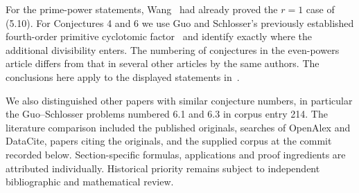 \documentclass[11pt,a4paper]{article}
\numberwithin{equation}{section}
\begin{document}
For the prime-power statements, Wang~\cite{Wang} had already proved the $r=1$ case of (5.10). For Conjectures 4 and 6 we use Guo and Schlosser's previously established fourth-order primitive cyclotomic factor~\cite{GS4} and identify exactly where the additional divisibility enters. The numbering of conjectures in the even-powers article differs from that in several other articles by the same authors. The conclusions here apply to the displayed statements in~\cite{GS}.
 
We also distinguished other papers with similar conjecture numbers, in particular the Guo--Schlosser problems numbered 6.1 and 6.3 in corpus entry 214. The literature comparison included the published originals, searches of OpenAlex and DataCite, papers citing the originals, and the supplied corpus at the commit recorded below. Section-specific formulas, applications and proof ingredients are attributed individually. Historical priority remains subject to independent bibliographic and mathematical review.
 
\end{document}
